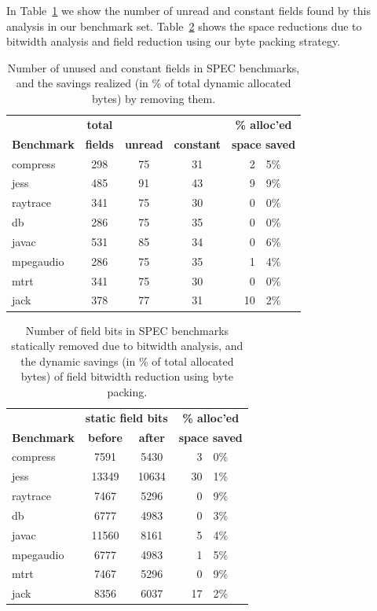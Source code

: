\documentclass{sig-alt-full}
\begin{document}
In Table~\ref{tab:const-unused} we show the number of unread and
constant fields found by this analysis in our benchmark set.
Table~\ref{tab:bitwidth-results} shows the space reductions due to
bitwidth analysis and field reduction using our byte packing strategy.
\begin{table}[t]
\begin{tabular}{lcccr@{.}l}
&\bf total&&&\multicolumn{2}{c}{\bf\% alloc'ed}\\
\bf Benchmark&\bf fields &\bf unread &\bf constant &
\multicolumn{2}{c}{\bf space saved} \\\hline
compress   & 298 &   75   &   31   &  2&5\% \\
jess       & 485 &   91   &   43   &  9&9\% \\
raytrace   & 341 &   75   &   30   &  0&0\% \\
db         & 286 &   75   &   35   &  0&0\% \\
javac      & 531 &   85   &   34   &  0&6\% \\
mpegaudio  & 286 &   75   &   35   &  1&4\% \\
mtrt       & 341 &   75   &   30   &  0&0\% \\
jack       & 378 &   77   &   31   & 10&2\% \\
\end{tabular}
\caption{Number of unused and constant fields in SPEC benchmarks,
  and the savings realized (in \% of total dynamic allocated bytes) by
  removing them.}
\label{tab:const-unused}
\end{table}
\begin{table}[t]
\centering\begin{tabular}{lccr@{.}l}
&\multicolumn{2}{c}{\bf static field bits}&\multicolumn{2}{c}{\bf\% alloc'ed}\\
\bf Benchmark &
\bf before & \bf after &
\multicolumn{2}{c}{\bf space saved} \\ \hline
compress   & 7591& 5430&  3&0\% \\
jess       &13349&10634& 30&1\% \\
raytrace   & 7467& 5296&  0&9\% \\
db         & 6777& 4983&  0&3\% \\
javac      &11560& 8161&  5&4\% \\
mpegaudio  & 6777& 4983&  1&5\% \\
mtrt       & 7467& 5296&  0&9\% \\
jack       & 8356& 6037& 17&2\% \\
\end{tabular}
\caption{Number of field bits in SPEC benchmarks statically removed
  due to bitwidth analysis,
  and the dynamic savings (in \% of total allocated bytes) of
  field bitwidth reduction using byte packing.}
\label{tab:bitwidth-results}
\end{table}
\end{document}
